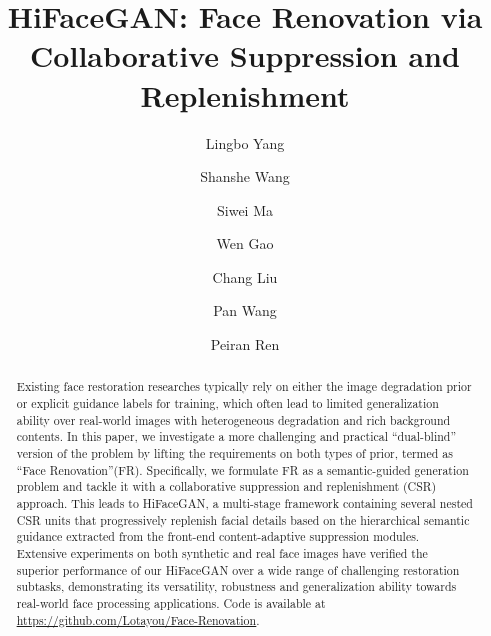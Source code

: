 \documentclass[sigconf]{acmart}
\begin{document}
	\fancyhead{}

\title{HiFaceGAN: Face Renovation via \\ Collaborative Suppression and Replenishment}

\author{Lingbo Yang}
\author{Shanshe Wang}
\author{Siwei Ma}
\author{Wen Gao}

\author{Chang Liu}
\authornotemark[1]

\author{Pan Wang}
\author{Peiran Ren}


\def\TODO[#1]{\textcolor{red}{#1}}
\def\NOTE[#1]{(\textcolor{blue}{#1})}


\def \etal{~\emph{et. al. }}
\def \L{\mathcal{L}}

\def \check {}
\def \cross {}


\renewcommand{\shortauthors}{Yang and Liu, et al.}

\begin{abstract}
	
	Existing face restoration researches typically rely on either the image degradation prior or explicit guidance labels for training, which often lead to limited generalization ability over real-world images with heterogeneous degradation and rich background contents. In this paper, we investigate a more challenging and practical ``dual-blind'' version of the problem by lifting the requirements on both types of prior, termed as ``Face Renovation''(FR). Specifically, we formulate FR as a semantic-guided generation problem and tackle it with a collaborative suppression and replenishment (CSR) approach. This leads to HiFaceGAN, a multi-stage framework containing several nested CSR units that progressively replenish facial details based on the hierarchical semantic guidance extracted from the front-end content-adaptive suppression modules. Extensive experiments on both synthetic and real face images have verified the superior performance of our HiFaceGAN over a wide range of challenging restoration subtasks, demonstrating its versatility, robustness and generalization ability towards real-world face processing applications. Code is available at \href{https://github.com/Lotayou/Face-Renovation}{\underline{https://github.com/Lotayou/Face-Renovation}}.
	
\end{abstract}
\end{document}

